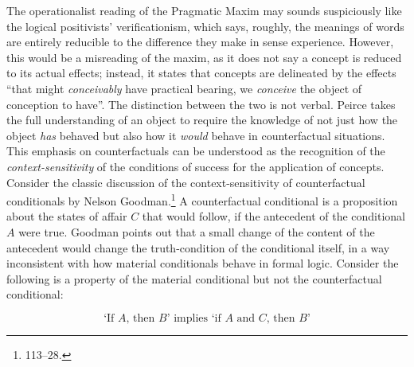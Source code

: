 The operationalist reading of the Pragmatic Maxim may sounds
suspiciously like the logical positivists' verificationism, which says, roughly, the meanings of words are entirely reducible to
the difference they make in sense experience. However, this would be a misreading of the
maxim, as it does not say a concept is reduced to its actual effects;
instead, it states that concepts are delineated by the effects ``that
might \emph{conceivably} have practical bearing, we \emph{conceive} the
object of conception to have''. The distinction between the two is not
verbal. Peirce takes the full understanding of an object to require the knowledge of not just
how the object \emph{has} behaved but also how it \emph{would} behave in counterfactual situations. This emphasis on counterfactuals can be understood as the recognition of the \emph{context-sensitivity} of the conditions of success for the
application of concepts. Consider the classic discussion of the
context-sensitivity of counterfactual conditionals by Nelson
Goodman.\footnote{\cite{goodmancounterfactual}
  113--28.} A counterfactual conditional is a proposition about the
states of affair \(C\) that would follow, if the antecedent of the
conditional \(A\) were true. Goodman points out that a small change of
the content of the antecedent would change the truth-condition of the
conditional itself, in a way inconsistent with how material conditionals
behave in formal logic. Consider the following is a property of the
material conditional but not the counterfactual conditional:

\begin{equation}\label{eq:cfconschema}
	\text{`If \(A\), then \(B\)' implies `if \(A\) and \(C\), then \(B\)'}
\end{equation}


